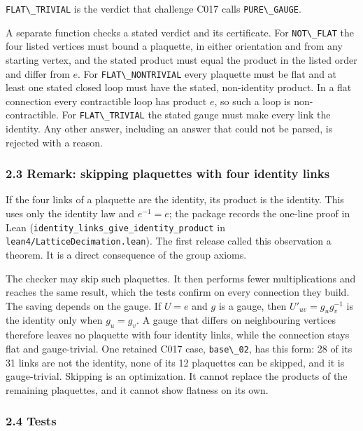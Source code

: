 \documentclass[
  11pt,
]{article}
\newcommand{\passthrough}[1]{#1}
\begin{document}
\passthrough{\lstinline!FLAT\_TRIVIAL!} is the verdict that challenge
C017 calls \passthrough{\lstinline!PURE\_GAUGE!}.

A separate function checks a stated verdict and its certificate. For
\passthrough{\lstinline!NOT\_FLAT!} the four listed vertices must bound
a plaquette, in either orientation and from any starting vertex, and the
stated product must equal the product in the listed order and differ
from \(e\). For \passthrough{\lstinline!FLAT\_NONTRIVIAL!} every
plaquette must be flat and at least one stated closed loop must have the
stated, non-identity product. In a flat connection every contractible
loop has product \(e\), so such a loop is non-contractible. For
\passthrough{\lstinline!FLAT\_TRIVIAL!} the stated gauge must make every
link the identity. Any other answer, including an answer that could not
be parsed, is rejected with a reason.

\subsubsection{2.3 Remark: skipping plaquettes with four identity
links}\label{remark-skipping-plaquettes-with-four-identity-links}

If the four links of a plaquette are the identity, its product is the
identity. This uses only the identity law and \(e^{-1} = e\); the
package records the one-line proof in Lean
(\nolinkurl{identity_links_give_identity_product} in
\mbox{\nolinkurl{lean4/LatticeDecimation.lean}}). The first release
called this observation a theorem. It is a direct consequence of the
group axioms.

The checker may skip such plaquettes. It then performs fewer
multiplications and reaches the same result, which the tests confirm on
every connection they build. The saving depends on the gauge. If
\(U = e\) and \(g\) is a gauge, then \(U'_{uv} = g_u g_v^{-1}\) is the
identity only when \(g_u = g_v\). A gauge that differs on neighbouring
vertices therefore leaves no plaquette with four identity links, while
the connection stays flat and gauge-trivial. One retained C017 case,
\passthrough{\lstinline!base\_02!}, has this form: 28 of its 31 links
are not the identity, none of its 12 plaquettes can be skipped, and it
is gauge-trivial. Skipping is an optimization. It cannot replace the
products of the remaining plaquettes, and it cannot show flatness on its
own.

\subsubsection{2.4 Tests}\label{tests}
\end{document}
